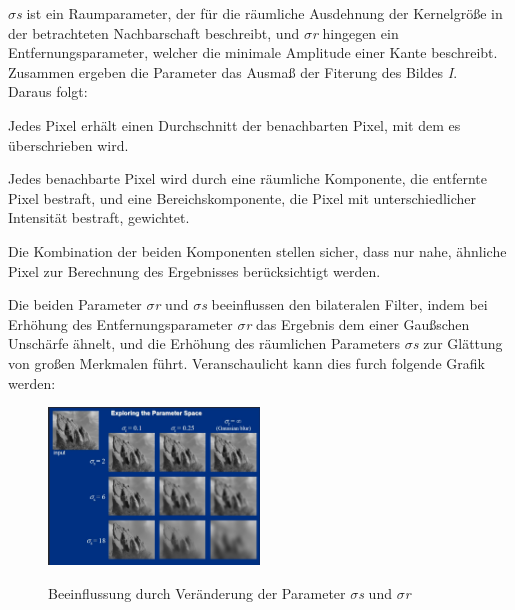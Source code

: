 \textit{\(\sigma\)s} ist ein Raumparameter, der für die räumliche Ausdehnung der Kernelgröße in der betrachteten Nachbarschaft beschreibt, und \textit{\(\sigma\)r} hingegen ein Entfernungsparameter, welcher die minimale Amplitude einer Kante beschreibt. Zusammen ergeben die Parameter das Ausmaß der Fiterung des Bildes \textit{I}.\\
Daraus folgt:
\begin{compactenum}
    \item Jedes Pixel erhält einen Durchschnitt der benachbarten Pixel, mit dem es überschrieben wird.
    \item Jedes benachbarte Pixel wird durch eine räumliche Komponente, die entfernte Pixel bestraft, und eine Bereichskomponente, die Pixel mit unterschiedlicher Intensität bestraft, gewichtet.
    \item Die Kombination der beiden Komponenten stellen sicher, dass nur nahe, ähnliche Pixel zur Berechnung des Ergebnisses berücksichtigt werden.
\end{compactenum}
Die beiden Parameter \textit{\(\sigma\)r} und \textit{\(\sigma\)s} beeinflussen den bilateralen Filter, indem bei Erhöhung des Entfernungsparameter \textit{\(\sigma\)r} das Ergebnis dem einer Gaußschen Unschärfe ähnelt, und die Erhöhung des räumlichen Parameters \textit{\(\sigma\)s} zur Glättung von großen Merkmalen führt. Veranschaulicht kann dies furch folgende Grafik werden:
\begin{figure}[H]
    \centering
    \includegraphics[width=0.5\textwidth]{pics/ParameterBeeinflussungBilateralFilter.jpg}
    \caption{Beeinflussung durch Veränderung der Parameter \textit{\(\sigma\)s} und \textit{\(\sigma\)r}}
    \cite{ParameterBilat}
    \label{fig:anpr:bilat:parameter}
    \end{figure}



